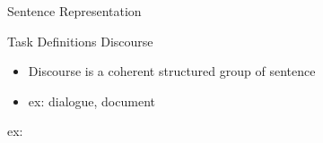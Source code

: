 \documentclass[10pt]{beamer}
\begin{document}
\begin{frame}[t]{Sentence Representation}

    \begin{figure}
        \begin{center}
        \end{center}
    \end{figure}
    \begin{center}
    \end{center}
\end{frame}

\begin{frame}{Task Definitions}
    Discourse 
    \begin{itemize}
        \item Discourse is a coherent structured group of sentence 
        \item ex: dialogue, document
    \end{itemize}

    ex: 

    \begin{figure}
        \begin{center}
        \end{center}
    \end{figure}

\end{frame}
\end{document}
